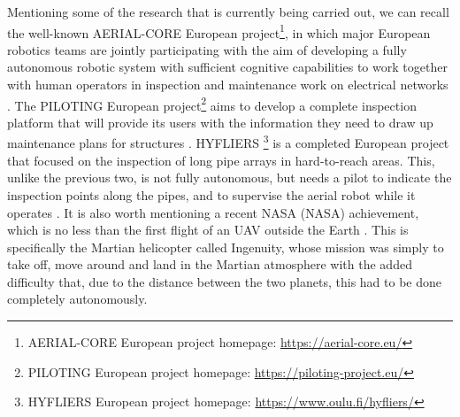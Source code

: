 Mentioning some of the research that is currently being carried out, we can recall the well-known AERIAL-CORE European project\footnote{AERIAL-CORE European project homepage: \url{https://aerial-core.eu/}}, in which major European robotics teams are jointly participating with the aim of developing a fully autonomous robotic system with sufficient cognitive capabilities to work together with human operators in inspection and maintenance work on electrical networks \cite{cacace2021safe}. The PILOTING European project\footnote{PILOTING European project homepage: \url{https://piloting-project.eu/}} aims to develop a complete inspection platform that will provide its users with the information they need to draw up maintenance plans for structures \cite{benjumea2021localization}. HYFLIERS \footnote{HYFLIERS European project homepage: \url{https://www.oulu.fi/hyfliers/}} is a completed European project that focused on the inspection of long pipe arrays in hard-to-reach areas. This, unlike the previous two, is not fully autonomous, but needs a pilot to indicate the inspection points along the pipes, and to supervise the aerial robot while it operates \cite{suarez2020aerial}. It is also worth mentioning a recent \acrshort{NASA} (\acrlong{NASA}) achievement, which is no less than the first flight of an \gls{UAV} outside the Earth \cite{schroeder2020nasa, potter2020mars}. This is specifically the Martian helicopter called Ingenuity, whose mission was simply to take off, move around and land in the Martian atmosphere with the added difficulty that, due to the distance between the two planets, this had to be done completely autonomously.

